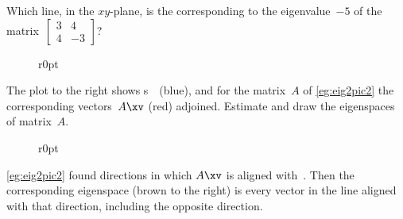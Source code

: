 \begin{activity}
Which line, in the \(xy\)-plane, is the  corresponding to the eigenvalue~\(-5\) of the matrix~\(\begin{bmatrix} 3&4\\4&-3 \end{bmatrix}\)?
\end{activity}




\begin{wrapfigure}r{0pt}
\end{wrapfigure}
\begin{example} \label{eg:eig2sp2} 
The plot to the right shows s~\xv\  (blue), and for the matrix~\(A\) of \cref{eg:eig2pic2} the corresponding vectors~\(A\xv\) (red) adjoined. 
Estimate and draw the eigenspaces of matrix~\(A\).

\begin{solution}
\begin{wrapfigure}r{0pt}
\def\eRoseHook{%
\addplot[brown,domain=-1.5:1.5,very thick] ({0.34*x},{0.94*x});
\node[right] at (axis cs:0.41,1.13) {$\EE_{-0.4}$};
\addplot[brown,domain=-2.6:2.6,very thick] ({0.94*x},{-0.34*x});
\node[above] at (axis cs:-2.1,0.75) {$\EE_{1.2}$};
}%
\end{wrapfigure}
\cref{eg:eig2pic2} found directions in which \(A\xv\) is aligned with~\xv.
Then the corresponding eigenspace (brown to the right) is every vector in the line aligned with that direction, including the opposite direction.
\aqed

\end{solution}
\end{example}



